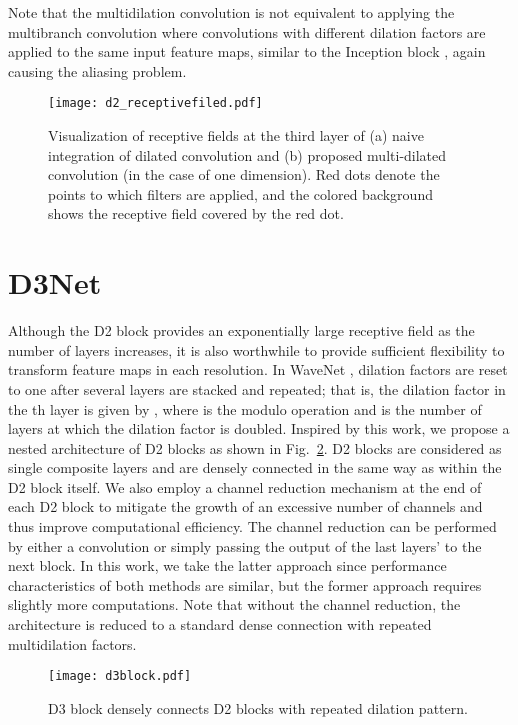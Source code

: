 \documentclass{article}
\begin{document}
Note that the multidilation convolution is not equivalent to applying the multibranch convolution where convolutions with different dilation factors are applied to the same input feature maps, similar to the Inception block \cite{McMahan18, Szegedy15, Szegedy16}, again causing the aliasing problem.

\begin{figure}[t]
  \centering
  \texttt{[image: d2\_receptivefiled.pdf]}
  \caption{Visualization of receptive fields at the third layer of (a) naive integration of dilated convolution and (b) proposed multi-dilated convolution (in the case of one dimension). Red dots denote the points to which filters are applied, and the colored background shows the receptive field covered by the red dot.}
  \label{fig:d2rf}
\end{figure}

\section{D3Net}
\label{sec:d3}
Although the D2 block provides an exponentially large receptive field as the number of layers increases, it is also worthwhile to provide sufficient flexibility to transform feature maps in each resolution. In WaveNet \cite{Aaron2016WN}, dilation factors are reset to one after several layers are stacked and repeated; that is, the dilation factor in the th layer is given by , where  is the modulo operation and  is the number of layers at which the dilation factor is doubled. Inspired by this work, we propose a nested architecture of D2 blocks as shown in Fig.~\ref{fig:D3 block}. D2 blocks are considered as single composite layers and are densely connected in the same way as within the D2 block itself. We also employ a channel reduction mechanism at the end of each D2 block to mitigate the growth of an excessive number of channels and thus improve computational efficiency. The channel reduction can be performed by either a  convolution or simply passing the output of the last  layers' to the next block. In this work, we take the latter approach since performance characteristics of both methods are similar, but the former approach requires slightly more computations. Note that without the channel reduction, the architecture is reduced to a standard dense connection with repeated multidilation factors.

\begin{figure}[t]
  \centering
  \texttt{[image: d3block.pdf]}
  \caption{D3 block densely connects D2 blocks with repeated dilation pattern.}
  \label{fig:D3 block}
\end{figure}
\end{document}
